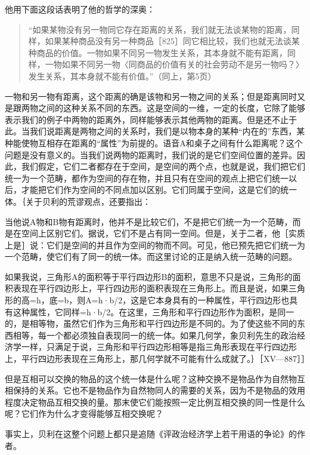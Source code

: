 他用下面这段话表明了他的哲学的深奥：

\begin{quote}{“如果某物没有另一物同它存在距离的关系，我们就无法谈某物的距离，同样，如果某种商品没有另一种商品［825］同它相比较，我们也就无法谈某种商品的价值。一物如果不同另一物发生关系，其本身就不能有距离，同样，一物如果不同另一物〈同商品的价值有关的社会劳动不是另一物吗？〉发生关系，其本身就不能有价值。”（同上，第5页）}\end{quote}

一物和另一物有距离，这个距离的确是该物和另一物之间的关系；但是距离同时又是跟两物之间的这种关系不同的东西。这是空间的一维，一定的长度，它除了能够表示我们的例子中两物的距离外，同样能够表示其他两物的距离。但是还不止于此。当我们说距离是两物之间的关系时，我们是以物本身的某种“内在的”东西，某种能使物互相存在距离的“属性”为前提的。语音A和桌子之间有什么距离呢？这个问题是没有意义的。当我们说两物的距离时，我们说的是它们空间位置的差异。因此，我们假定，它们二者都存在于空间，是空间的两个点，也就是说，我们把它们统一为一个范畴，都作为空间的存在物，并且只有在空间的观点上把它们统一以后，才能把它们作为空间的不同点加以区别。它们同属于空间，这是它们的统一体。｛关于贝利的荒谬观点，还要指出：

当他说A物和B物有距离时，他并不是比较它们，不是把它们统一为一个范畴，而是在空间上区别它们。据说，它们不是占有同一空间。但是，关于二者，他［实质上是］说：它们是空间的并且作为空间的物而不同。可见，他已预先把它们统一为一个范畴，使它们有了同一的统一体。而这里讨论的正是纳入统一范畴的问题。

如果我说，三角形A的面积等于平行四边形B的面积，意思不只是说，三角形的面积表现在平行四边形上，平行四边形的面积表现在三角形上。而且是说，如果三角形的高=h，底=b，则A=h·b/2，这是它本身具有的一种属性，平行四边形也具有这种属性，它同样=h·b/2。在这里，三角形和平行四边形作为面积，是同一的，是相等物，虽然它们作为三角形和平行四边形是不同的。为了使这些不同的东西相等，每一个都必须独自表现同一的统一体。如果几何学，象贝利先生的政治经济学一样，只满足于说，三角形和平行四边形相等是指三角形表现在平行四边形上，平行四边形表现在三角形上，那几何学就不可能有什么成就了。｝［XV—887］］

但是互相可以交换的物品的这个统一体是什么呢？这种交换不是物品作为自然物互相保持的关系。它也不是物品作为自然物同人的需要的关系，因为不是物品的效用程度决定物品互相交换的量。那末使它们能按照一定比例互相交换的同一性是什么呢？它们作为什么才变得能够互相交换呢？

事实上，贝利在这整个问题上都只是追随《评政治经济学上若干用语的争论》的作者。

